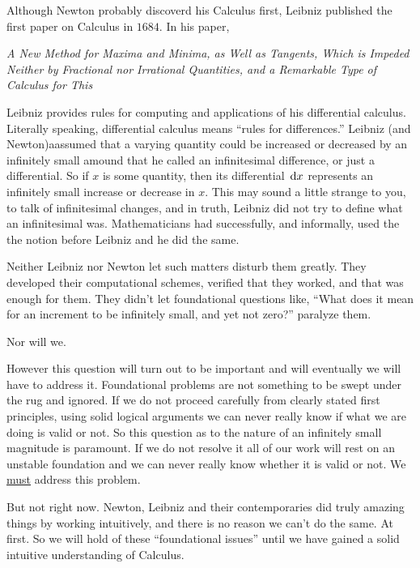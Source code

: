 Although Newton probably discoverd his Calculus first, Leibniz published the first
paper on Calculus in $1684.$ In his paper,\\
\begin{center}
  \begin{minipage}[c]{.75\linewidth}
    {\it{}A New Method for Maxima and Minima, as Well as Tangents,
      Which is Impeded Neither by Fractional nor Irrational
      Quantities, and a Remarkable Type of Calculus for This}
  \end{minipage}
\end{center}
Leibniz provides rules for computing and
applications of his differential calculus.  Literally speaking,
differential calculus means ``rules for differences.''  
Leibniz (and Newton)aassumed that a varying quantity could be
increased or decreased by an infinitely small amound that he called an
infinitesimal difference, or just a differential.  So if $x$ is some quantity, then its differential $\thinspace{\rm d}x$ represents an infinitely
small increase or decrease in $x.$  This may sound a little strange to
you, to talk of infinitesimal changes, and in truth, Leibniz did not
try to define what an infinitesimal was.  Mathematicians had
successfully, and informally, used the the notion  before Leibniz and he did
the same.

Neither Leibniz nor Newton let such matters disturb them greatly. They
developed their computational schemes, verified that they worked, and
that was enough for them. They didn't let foundational questions like,
``What does it mean for an increment to be infinitely small, and yet
not zero?''  paralyze them.

Nor will we.

However this question will turn out to be important and will
eventually we will have to address it.  Foundational problems  are not something to
be swept under the rug and ignored. If we do not proceed carefully
from clearly stated first principles, using solid logical arguments we
can never really know if what we are doing is valid or not. So this
question as to the nature of an infinitely small magnitude is
paramount. If we do not resolve it all of our work will rest on an
unstable foundation and we can never really know whether it is valid
or not. We \underline{must} address this problem.

But not right now. Newton, Leibniz and their contemporaries
did truly amazing things by working intuitively, and there is no
reason we can't do the same. At first. So we will hold of these
``foundational issues'' until we have gained a solid intuitive
understanding of Calculus.


